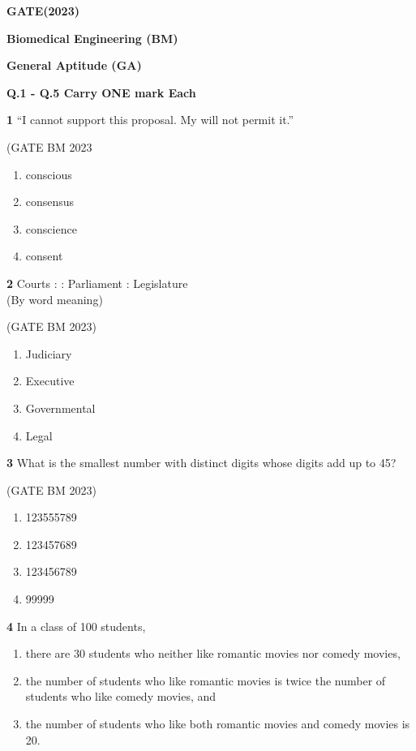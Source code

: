 \documentclass[journal]{IEEEtran}
\numberwithin{equation}{enumi}
\numberwithin{figure}{enumi}
\begin{document}

\begin{center}
    \textbf{\Large GATE(2023)}
    
    \textbf{Biomedical Engineering (BM)}
    
    \vspace{0.5cm}
    \textbf{General Aptitude (GA)}
    \end{center}
    \textbf{Q.1 - Q.5 Carry ONE mark Each}


 \textbf{1} \quad ``I cannot support this proposal. My \underline{\hspace{3cm}} will not permit it.''
 
\hfill (GATE BM 2023

\begin{enumerate}
    \item conscious
    \item consensus
    \item conscience
    \item consent
    
\end{enumerate}


\noindent \textbf{2} \quad Courts : \underline{\hspace{2cm}} : Parliament : Legislature\\
(By word meaning)

\hfill (GATE BM 2023)

\begin{enumerate}
    \item Judiciary
    \item Executive
    \item Governmental
    \item Legal
\end{enumerate}


\textbf{3} What is the smallest number with distinct digits whose digits add up to 45?

\hfill (GATE BM 2023)

\begin{enumerate}[label=(\Alph*)]
    \item 123555789
    \item 123457689
    \item 123456789
    \item 99999
\end{enumerate}


\textbf{4} 
In a class of 100 students,
\begin{enumerate}
    \item there are 30 students who neither like romantic movies nor comedy movies,
    \item the number of students who like romantic movies is twice the number of students who like comedy movies, and
    \item the number of students who like both romantic movies and comedy movies is 20.
\end{enumerate}
\end{document}
